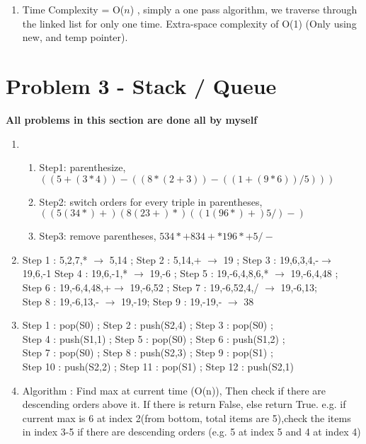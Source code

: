 \documentclass{article}
\begin{document}
\begin{CJK*}{UTF8}{bsmi}
\begin{enumerate}
\begin{enumerate}
        \item Time Complexity = O(${n}$) , simply a one pass algorithm, we traverse through the linked list for only one time. Extra-space complexity of O(1) (Only using new, and temp pointer).
    \end{enumerate}
    
\end{enumerate}

\section{Problem 3 - Stack / Queue }
\textbf{All problems in this section are done all by myself}
\begin{enumerate}
    \item 
        \begin{enumerate}
        \item Step1: parenthesize, $ ((5+(3*4)) - ((8*(2+3))-((1+(9*6))/5)))$
        \item Step2: switch orders for every triple in parentheses, $((5(34*)+)(8(23+)*)((1(96*)+)5/)-)$
        \item Step3: remove parentheses, $534*+834+*196*+5/-$
        \end{enumerate}
    
    \item Step 1 : 5,2,7,* $\rightarrow$ 5,14 ; Step 2 : 5,14,+ $\rightarrow$ 19 ; Step 3 : 19,6,3,4,-$\rightarrow$19,6,-1  Step 4 : 19,6,-1,* $\rightarrow$ 19,-6 ; Step 5 : 19,-6,4,8,6,* $\rightarrow$ 19,-6,4,48 ; \\
    Step 6 : 19,-6,4,48,+$ \rightarrow$ 19,-6,52 ; Step 7 : 19,-6,52,4,/ $\rightarrow$ 19,-6,13; \\
    Step 8 : 19,-6,13,- $\rightarrow$ 19,-19; Step 9 : 19,-19,- $\rightarrow$ 38

    \item Step 1 : pop(S0) ; Step 2 : push(S2,4) ; Step 3 : pop(S0) ;\\ Step 4 : push(S1,1) ; Step 5 : pop(S0) ; Step 6 : push(S1,2) ; \\ Step 7 : pop(S0) ; Step 8 : push(S2,3) ; Step 9 : pop(S1) ; \\Step 10 : push(S2,2) ; Step 11 : pop(S1) ; Step 12 : push(S2,1)

    \item Algorithm : Find max at current time (O(n)), Then check if there are descending orders above it. If there is return False, else return True. e.g. if current max is 6 at index 2(from bottom, total items are 5),check the items in index 3-5 if there are descending orders (e.g. 5 at index 5 and 4 at index 4)


\end{enumerate}
\end{CJK*}
\end{document}
